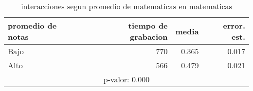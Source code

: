 \documentclass[spanish]{article}
\begin{document}
\begin{table}[h!]
\begin{center}
\begin{tabular}{|l|r|r|r|}
\hline
promedio de notas & tiempo de grabacion & media          & error. est.    \\ \hline
Bajo              &                 770 &          0.365 &           0.017\\ \hline
Alto              &                 566 &          0.479 &           0.021\\ \hline
\multicolumn{4}{|c|}{p-valor: 0.000} \\ \hline
\end{tabular}
\caption{interacciones segun promedio de matematicas en matematicas}
\end{center}
\end{table}
\end{document}
